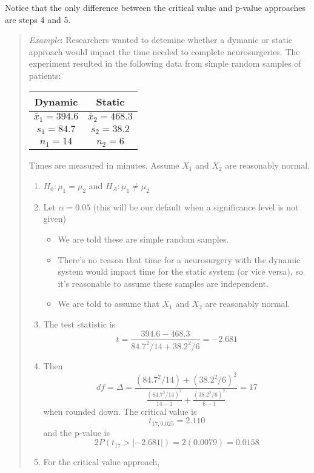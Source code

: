 \documentclass[
]{book}
\providecommand{\tightlist}{%
  \setlength{\itemsep}{0pt}\setlength{\parskip}{0pt}}
\begin{document}
Notice that the only difference between the critical value and p-value approaches are steps 4 and 5.

\begin{quote}
\emph{Example}: Researchers wanted to detemine whether a dymanic or static approach would impact the time needed to complete neurosurgeries. The experiment resulted in the following data from simple random samples of patients:

\begin{longtable}[]{@{}cc@{}}
\toprule
Dynamic & Static \\
\midrule
\endhead
\(\bar{x}_1 = 394.6\) & \(\bar{x}_2 = 468.3\) \\
\(s_1 = 84.7\) & \(s_2 = 38.2\) \\
\(n_1 = 14\) & \(n_2 = 6\) \\
\bottomrule
\end{longtable}

Times are measured in minutes. Assume \(X_1\) and \(X_2\) are reasonably normal.

\begin{enumerate}
\def\labelenumi{\arabic{enumi}.}
\tightlist
\item
  \(H_0: \mu_1 = \mu_2\) and \(H_A: \mu_1\ne\mu_2\)
\item
  Let \(\alpha=0.05\) (this will be our default when a significance level is not given)

  \begin{itemize}
  \tightlist
  \item
    We are told these are simple random samples.
  \item
    There's no reason that time for a neurosurgery with the dynamic system would impact time for the static system (or vice versa), so it's reasonable to assume these samples are independent.
  \item
    We are told to assume that \(X_1\) and \(X_2\) are reasonably normal.
  \end{itemize}
\item
  The test statistic is \[t = \frac{394.6-468.3}{84.7^2/14 + 38.2^2/6} = -2.681\]
\item
  Then \[df = \Delta = \frac{(84.7^2/14) + (38.2^2/6)^2}{\frac{(84.7^2/14)^2}{14-1} + \frac{(38.2^2/6)^2}{6-1}} = 17\] when rounded down. The critical value is \[t_{17, 0.025} = 2.110\] and the p-value is \[2P(t_{17}>|-2.681|)=2(0.0079)=0.0158\]
\item
  For the critical value approach,
\end{enumerate}
\end{quote}
\end{document}
